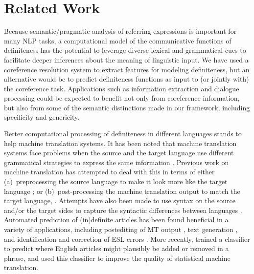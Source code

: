 \documentclass[11pt,letterpaper]{article}
\begin{document}
\section{Related Work}\label{sec:related}

Because semantic\slash pragmatic analysis of referring expressions is important for many NLP tasks,  
a computational model of the communicative functions of definiteness has the potential to leverage 
diverse lexical and grammatical cues to facilitate deeper inferences about the meaning of linguistic input.
We have used a coreference resolution system to extract features for modeling definiteness, but 
an alternative would be to predict definiteness functions as input to (or jointly with) the coreference task. 
Applications such as information extraction and dialogue processing could be expected to benefit not only from 
coreference information, but also from some of the semantic distinctions made in our framework, including specificity and genericity.

Better computational processing of definiteness in different languages stands to help machine translation systems. 
It has been noted that machine translation systems face problems when the source and the target language 
use different grammatical strategies to express the same information \citep{stymne09,tsvetkov13}. 
Previous work on machine translation has attempted to deal with this in terms of either 
(a)~preprocessing the source language to make it look more like the target language \citep[\textit{inter alia}]{collins05,habash07,niessen00,stymne09}; 
or (b)~post-processing the machine translation output to match the target language, \cite[e.g.,][]{popovic06}. 
Attempts have also been made to use syntax on the source and\slash or the target sides 
to capture the syntactic differences between languages \citep{liu06,yamada02,zhang07}. 
Automated prediction of (in)definite articles has been found beneficial in a variety of applications, 
including postediting of MT output \citep{knight1994automated}, text generation \citep{DBLP:conf/aaai/Elhadad93,minnen2000memory}, 
and identification and correction of ESL errors \citep{aehan2006detecting,rozovskaya2010training}. 
More recently, \citet{tsvetkov13} trained a classifier to predict where English articles might plausibly be added or removed in a phrase, 
and used this classifier to improve the quality of statistical machine translation. 
\end{document}
